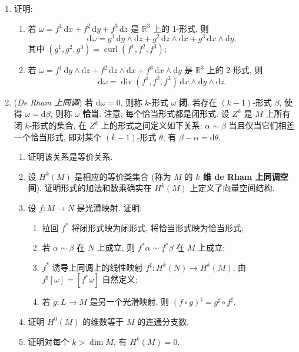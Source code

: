 \begin{RiemannExercise}
\begin{enumerate}[label=(\arabic*),ref=\arabic*,leftmargin=*]
\item\label{ex:exterior-derivative-curl-and-divergence} 证明:
\begin{enumerate}[label=(\alph*),leftmargin=*]
\item 若 $\omega=f^1\,\mathrm{d}x+f^2\,\mathrm{d}y+f^3\,\mathrm{d}z$ 是 $\mathbb{R}^3$ 上的 1-形式, 则
\[
  \mathrm{d}\omega=g^1\,\mathrm{d}y\wedge\mathrm{d}z
    +g^2\,\mathrm{d}z\wedge\mathrm{d}x+g^3\,\mathrm{d}x\wedge\mathrm{d}y,
\]
其中 $(g^1,g^2,g^3)=\operatorname{curl}(f^1,f^2,f^3)$;
\item 若 $\omega=f^1\,\mathrm{d}y\wedge\mathrm{d}z+f^2\,\mathrm{d}z\wedge\mathrm{d}x+f^3\,\mathrm{d}x\wedge\mathrm{d}y$ 是 $\mathbb{R}^3$ 上的 2-形式, 则
\[
  \mathrm{d}\omega=\operatorname{div}(f^1,f^2,f^3)\,\mathrm{d}x\wedge\mathrm{d}y\wedge\mathrm{d}z.
\]
\end{enumerate}
\item\label{ex:de-rham-cohomology} (\emph{De Rham 上同调}) 若 $\mathrm{d}\omega=0$, 则称 $k$-形式 $\omega$ \textbf{闭}. 若存在 $(k-1)$-形式 $\beta$, 使得 $\omega=\mathrm{d}\beta$, 则称 $\omega$ \textbf{恰当}. 注意, 每个恰当形式都是闭形式. 设 $Z^k$ 是 $M$ 上所有闭 $k$-形式的集合, 在 $Z^k$ 上的形式之间定义如下关系: $\alpha\sim\beta$ 当且仅当它们相差一个恰当形式, 即对某个 $(k-1)$-形式 $\theta$, 有 $\beta-\alpha=\mathrm{d}\theta$.
\begin{enumerate}[label=(\alph*),leftmargin=*]
\item 证明该关系是等价关系.
\item 设 $H^k(M)$ 是相应的等价类集合 (称为 $M$ 的 \textbf{$k$ 维 de Rham 上同调空间}). 证明形式的加法和数乘确实在 $H^k(M)$ 上定义了向量空间结构.
\item 设 $f:M\to N$ 是光滑映射. 证明:
\begin{enumerate}[label=(\roman*),leftmargin=*]
\item 拉回 $f^*$ 将闭形式映为闭形式, 将恰当形式映为恰当形式;
\item 若 $\alpha\sim\beta$ 在 $N$ 上成立, 则 $f^*\alpha\sim f^*\beta$ 在 $M$ 上成立;
\item $f^*$ 诱导上同调上的线性映射 $f^\sharp:H^k(N)\to H^k(M)$, 由 $f^\sharp[\omega]=[f^*\omega]$ 自然定义;
\item 若 $g:L\to M$ 是另一个光滑映射, 则 $(f\circ g)^\sharp=g^\sharp\circ f^\sharp$.
\end{enumerate}
\item 证明 $H^0(M)$ 的维数等于 $M$ 的连通分支数.
\item 证明对每个 $k>\dim M$, 有 $H^k(M)=0$.
\end{enumerate}

\end{enumerate}
\end{RiemannExercise}

